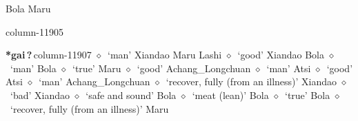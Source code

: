          Bola 
\hspace{1ex}
         Maru 
  \item {\footnotesize \textbf{}}{\tiny column-11905}
  \item {\footnotesize \textbf{*gai\,?\,}}{\tiny column-11907}
         $\diamond$~`man'
         Xiandao 
\hspace{1ex}
         Maru 
\hspace{1ex}
         Lashi 
\hspace{1ex}
         $\diamond$~`good'
         Xiandao 
\hspace{1ex}
         Bola 
\hspace{1ex}
         $\diamond$~`man'
         Bola 
\hspace{1ex}
         $\diamond$~`true'
         Maru 
\hspace{1ex}
         $\diamond$~`good'
         Achang\_Longchuan 
\hspace{1ex}
         $\diamond$~`man'
         Atsi 
\hspace{1ex}
         $\diamond$~`good'
         Atsi 
\hspace{1ex}
         $\diamond$~`man'
         Achang\_Longchuan 
\hspace{1ex}
         $\diamond$~`recover, fully (from an illness)'
         Xiandao 
\hspace{1ex}
         $\diamond$~`bad'
         Xiandao 
\hspace{1ex}
         $\diamond$~`safe and sound'
         Bola 
\hspace{1ex}
         $\diamond$~`meat (lean)'
         Bola 
\hspace{1ex}
         $\diamond$~`true'
         Bola 
\hspace{1ex}
         $\diamond$~`recover, fully (from an illness)'
         Maru 
